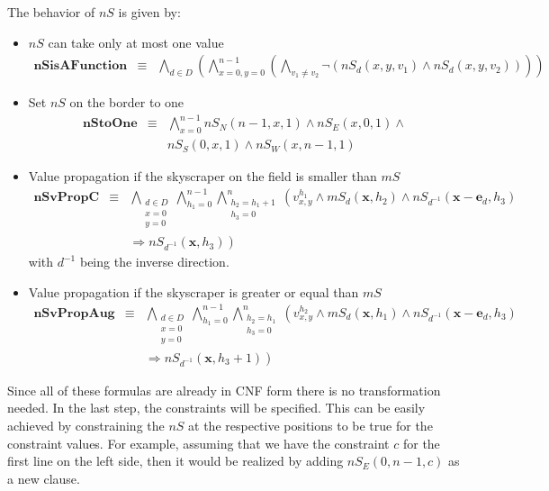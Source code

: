 \documentclass[a4paper, 12pt, titlepage]{article}
\begin{document}
The behavior of $nS$ is given by:
\begin{itemize}
	
\item $nS$ can take only at most one value
	\begin{eqnarray}
		\pmb{nSisAFunction} &\equiv& \bigwedge_{d\in D} \left( \bigwedge_{x=0,y=0}^{n-1} \left( \bigwedge_{v_1 \not = v_2} \neg \left( nS_{d}(x,y,v_1) \wedge nS_{d}(x,y,v_2) \right) \right) \right)
	\end{eqnarray}
	
\item Set $nS$ on the border to one
	\begin{eqnarray}
		\pmb{nStoOne} &\equiv& \bigwedge_{x=0}^{n-1} nS_{N}(n-1,x,1) \wedge nS_{E}(x,0,1) \wedge \nonumber \\
	&&  nS_{S}(0,x,1) \wedge nS_{W}(x,n-1,1)
	\end{eqnarray}
	
\item Value propagation if the skyscraper on the field is smaller than $mS$
	\begin{eqnarray}
		\pmb{nSvPropC} &\equiv& \bigwedge_{\substack{d\in D\\x=0\\y=0}} \bigwedge_{h_{1}=0}^{n-1} \bigwedge_{\substack{h_{2} = h_{1}+1\\h_{3}=0}}^{n} \left( v_{x,y}^{h_1} \wedge mS_d(\pmb x,h_2) \wedge nS_{d^{-1}}(\pmb x - \pmb e_d,h_3) \right. \nonumber \\
	&& \left.\Rightarrow nS_{d^{-1}}(\pmb x,h_3) \right)
	\end{eqnarray}
	with $d^{-1}$ being the inverse direction.

	\item Value propagation if the skyscraper is greater or equal than $mS$
	\begin{eqnarray}
		\pmb{nSvPropAug} &\equiv& \bigwedge_{\substack{d\in D\\x=0\\y=0}} \bigwedge_{h_{1}=0}^{n-1} \bigwedge_{\substack{h_{2} = h_{1}\\h_{3}=0}}^{n} \left( v_{x,y}^{h_2} \wedge mS_d(\pmb x,h_1) \wedge nS_{d^{-1}}(\pmb x - \pmb e_d,h_3) \right. \nonumber \\
	&& \left.\Rightarrow nS_{d^{-1}}(\pmb x,h_3+1) \right)
	\end{eqnarray}
\end{itemize}

Since all of these formulas are already in CNF form there is no transformation needed. In the last step, the constraints will be specified. This can be easily achieved by constraining the $nS$ at the respective positions to be true for the constraint values. For example, assuming that we have the constraint $c$ for the first line on the left side, then it would be realized by adding $nS_{E}(0,n-1,c)$ as a new clause.
\end{document}
